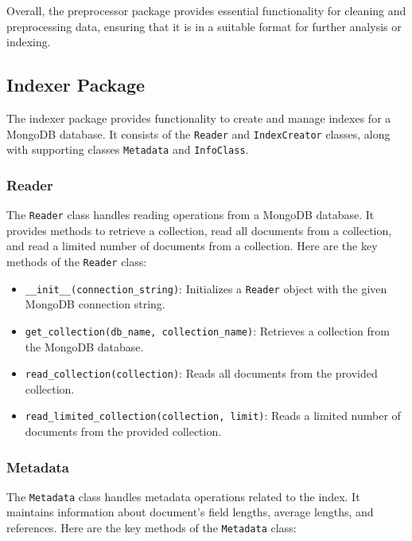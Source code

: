 \documentclass{article}
\begin{document}
Overall, the preprocessor package provides essential functionality for cleaning and 
preprocessing data, ensuring that it is in a suitable format for further analysis or indexing.

\subsection{Indexer Package}

The indexer package provides functionality to create and manage indexes for a MongoDB database. 
It consists of the \texttt{Reader} and \texttt{IndexCreator} classes, along with supporting 
classes \texttt{Metadata} and \texttt{InfoClass}.

\subsubsection{Reader}

The \texttt{Reader} class handles reading operations from a MongoDB database. It provides 
methods to retrieve a collection, read all documents from a collection, and read a limited 
number of documents from a collection. Here are the key methods of the \texttt{Reader} class:

\begin{itemize}
    \item \texttt{\_\_init\_\_(connection\_string)}: Initializes a \texttt{Reader} object with 
    the given MongoDB connection string.
    \item \texttt{get\_collection(db\_name, collection\_name)}: Retrieves a collection from the 
    MongoDB database.
    \item \texttt{read\_collection(collection)}: Reads all documents from the provided 
    collection.
    \item \texttt{read\_limited\_collection(collection, limit)}: Reads a limited number of 
    documents from the provided collection.
\end{itemize}

\subsubsection{Metadata}

The \texttt{Metadata} class handles metadata operations related to the index. It maintains 
information about document's field lengths, average lengths, and references. Here are the key methods of 
the \texttt{Metadata} class:
\end{document}

